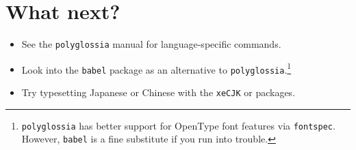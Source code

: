 \section{What next?}
\begin{itemize}
\item See the \texttt{polyglossia} manual for language-specific commands.
\item Look into the \texttt{babel} package as an alternative to
    \texttt{polyglossia}.\punckern\footnote{\texttt{polyglossia} has better
    support for OpenType font features via \texttt{fontspec}.
    However, \texttt{babel} is a fine substitute if you run into trouble.}
\item Try typesetting Japanese or Chinese with the \texttt{xeCJK} or
     packages.
\end{itemize}
